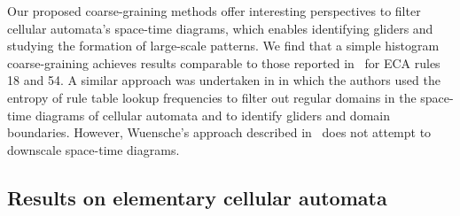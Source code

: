 Our proposed coarse-graining methods offer interesting perspectives to filter
cellular automata's space-time diagrams, which enables identifying gliders and
studying the formation of large-scale patterns. We find that a simple histogram
coarse-graining achieves results comparable to those reported
in~\cite{hansonAttractorbasinPortraitCellular1992,
  elorantaKinkCellularAutomaton1992, hansonComputationalMechanicsCellular1997,
  wuenscheExploringDiscreteDynamics2011} for ECA rules 18 and 54. A similar
approach was undertaken in \cite{wuenscheClassifyingCellularAutomata1999} in
which the authors used the entropy of rule table lookup frequencies to filter
out regular domains in the space-time diagrams of cellular automata and to
identify gliders and domain boundaries. However, Wuensche's approach described
in~\cite{wuenscheClassifyingCellularAutomata1999} does not attempt to downscale
space-time diagrams.

\subsection{Results on elementary cellular automata}

